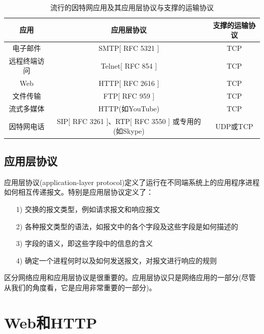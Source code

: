 \begin{table}[!htbp]
    \begin{center}
        \caption{流行的因特网应用及其应用层协议与支撑的运输协议}
        \begin{tabular}{| c | c | c |}
            \hline
            \textbf{应用} & \textbf{应用层协议} & \textbf{支撑的运输协议} \\
            \hline
            电子邮件 & SMTP[ RFC 5321 ] & TCP \\
            \hline
            远程终端访问 & Telnet[ RFC 854 ] & TCP \\
            \hline
            Web & HTTP[ RFC 2616 ] & TCP \\
            \hline
            文件传输 & FTP[ RFC 959 ] & TCP \\
            \hline
            流式多媒体 & HTTP(如YouTube) & TCP \\
            \hline
            因特网电话 & SIP[ RFC 3261 ]、RTP[ RFC 3550 ] 或专用的(如Skype) & UDP或TCP \\
            \hline
        \end{tabular}
    \end{center}
\end{table}

\subsection{应用层协议}

    应用层协议(application-layer protocol)定义了运行在不同端系统上的应用程序进程如何相互传递报文。特别是应用层协议定义了：

\begin{itemize}
    \item [1)] 交换的报文类型，例如请求报文和响应报文
    \item [2)] 各种报文类型的语法，如报文中的各个字段及这些字段是如何描述的
    \item [3)] 字段的语义，即这些字段中的信息的含义
    \item [4)] 确定一个进程何时以及如何发送报文，对报文进行响应的规则
\end{itemize}

    区分网络应用和应用层协议是很重要的。应用层协议只是网络应用的一部分(尽管从我们的角度看，它是应用非常重要的一部分)。

\section{Web和HTTP}


